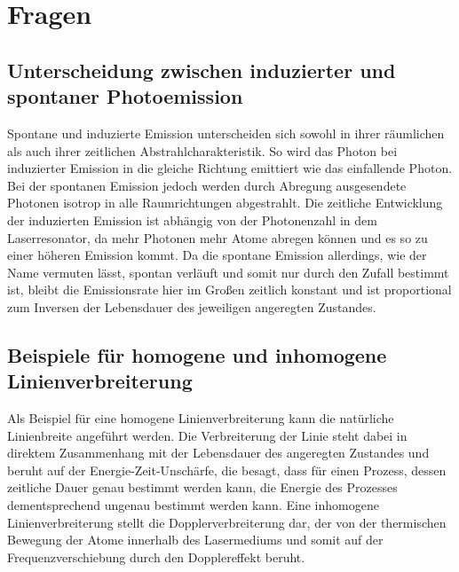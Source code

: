 \section{Fragen}
\subsection{Unterscheidung zwischen induzierter und spontaner  Photoemission}
Spontane und induzierte Emission unterscheiden sich sowohl in ihrer räumlichen als auch ihrer zeitlichen Abstrahlcharakteristik. \newline
So wird das Photon bei induzierter Emission in die gleiche Richtung emittiert wie das einfallende Photon. Bei der spontanen Emission jedoch werden durch Abregung ausgesendete Photonen isotrop in alle Raumrichtungen abgestrahlt. \newline
Die zeitliche Entwicklung der induzierten Emission ist abhängig von der Photonenzahl in dem Laserresonator, da mehr Photonen mehr Atome abregen können und es so zu einer höheren Emission kommt. Da die spontane Emission allerdings, wie der Name vermuten lässt, spontan verläuft und somit nur durch den Zufall bestimmt ist, bleibt die Emissionsrate hier im Großen zeitlich konstant und ist proportional zum Inversen der Lebensdauer des jeweiligen angeregten Zustandes.
\subsection{Beispiele für homogene und inhomogene Linienverbreiterung} 
Als Beispiel für eine homogene Linienverbreiterung kann die natürliche Linienbreite angeführt werden. Die Verbreiterung der Linie steht dabei in direktem Zusammenhang mit der Lebensdauer des angeregten Zustandes und beruht auf der Energie-Zeit-Unschärfe, die besagt, dass für einen Prozess, dessen zeitliche Dauer genau bestimmt werden kann, die Energie des Prozesses dementsprechend ungenau bestimmt werden kann. \newline
Eine inhomogene Linienverbreiterung stellt die Dopplerverbreiterung dar, der von der thermischen Bewegung der Atome innerhalb des Lasermediums und somit auf der Frequenzverschiebung durch den Dopplereffekt beruht. 
